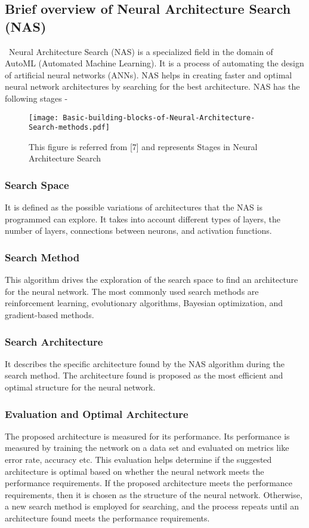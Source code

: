 \documentclass[conference]{IEEEtran}
\begin{document}
\subsection{Brief overview of Neural Architecture Search (NAS)} %
\
Neural Architecture Search (NAS) is a specialized field in the domain of AutoML (Automated Machine Learning). It is a process of automating the design of artificial neural networks (ANNs). NAS helps in creating faster and optimal neural network architectures by searching for the best architecture. NAS has the following stages - 
\begin{figure}[ht!] %
\centering
\texttt{[image: Basic-building-blocks-of-Neural-Architecture-Search-methods.pdf]} %
\caption{This figure is referred from [7] and represents Stages in Neural Architecture Search}
\label{fig:nas_blocks} %
\end{figure}

\subsubsection{Search Space} It is defined as the possible variations of architectures that the NAS is programmed can explore. It takes into account different types of layers, the number of layers, connections between neurons, and activation functions. 

\subsubsection{Search Method} This algorithm drives the exploration of the search space to find an architecture for the neural network. The most commonly used search methods are reinforcement learning, evolutionary algorithms, Bayesian optimization, and gradient-based methods. 

\subsubsection{Search Architecture} It describes the specific architecture found by the NAS algorithm during the search method. The architecture found is proposed as the most efficient and optimal structure for the neural network. 

\subsubsection{Evaluation and Optimal Architecture} The proposed architecture is measured for its performance. Its performance is measured by training the network on a data set and evaluated on metrics like error rate, accuracy etc. This evaluation helps determine if the suggested architecture is optimal based on whether the neural network meets the performance requirements. 
If the proposed architecture meets the performance requirements, then it is chosen as the structure of the neural network. Otherwise, a new search method is employed for searching, and the process repeats until an architecture found meets the performance requirements. 
\end{document}

